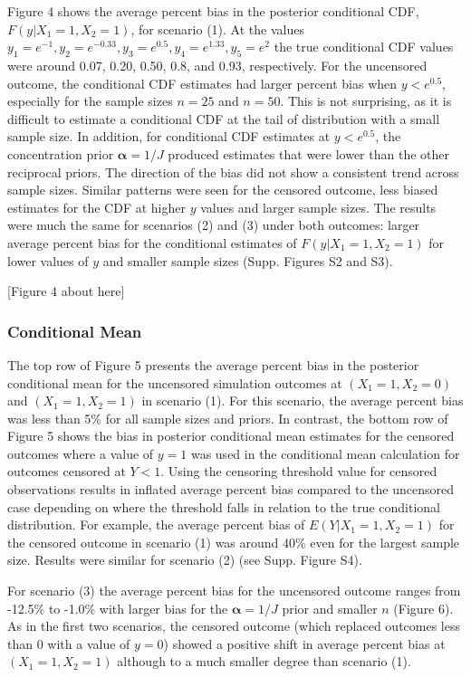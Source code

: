 \documentclass[
]{article}
\begin{document}
Figure 4 shows the average percent bias in the posterior conditional CDF, \(F(y|X_1=1,X_2=1)\), for scenario (1). At the values \(y_1=e^{-1},y_2=e^{-0.33},y_3=e^{0.5},y_4=e^{1.33},y_5=e^2\) the true conditional CDF values were around 0.07, 0.20, 0.50, 0.8, and 0.93, respectively. For the uncensored outcome, the conditional CDF estimates had larger percent bias when \(y<e^{0.5}\), especially for the sample sizes \(n=25\) and \(n=50\). This is not surprising, as it is difficult to estimate a conditional CDF at the tail of distribution with a small sample size. In addition, for conditional CDF estimates at \(y<e^{0.5}\), the concentration prior \(\boldsymbol{\alpha}=1/J\) produced estimates that were lower than the other reciprocal priors. The direction of the bias did not show a consistent trend across sample sizes. Similar patterns were seen for the censored outcome, less biased estimates for the CDF at higher \(y\) values and larger sample sizes. The results were much the same for scenarios (2) and (3) under both outcomes: larger average percent bias for the conditional estimates of \(F(y|X_1=1,X_2=1)\) for lower values of \(y\) and smaller sample sizes (Supp. Figures S2 and S3).

{[}Figure 4 about here{]}

\hypertarget{conditional-mean}{%
\subsubsection{Conditional Mean}\label{conditional-mean}}

The top row of Figure 5 presents the average percent bias in the posterior conditional mean for the uncensored simulation outcomes at \((X_1=1,X_2=0)\) and \((X_1=1,X_2=1)\) in scenario (1). For this scenario, the average percent bias was less than 5\% for all sample sizes and priors. In contrast, the bottom row of Figure 5 shows the bias in posterior conditional mean estimates for the censored outcomes where a value of \(y=1\) was used in the conditional mean calculation for outcomes censored at \(Y<1\). Using the censoring threshold value for censored observations results in inflated average percent bias compared to the uncensored case depending on where the threshold falls in relation to the true conditional distribution. For example, the average percent bias of \(E(Y|X_1=1,X_2=1)\) for the censored outcome in scenario (1) was around 40\% even for the largest sample size. Results were similar for scenario (2) (see Supp. Figure S4).

For scenario (3) the average percent bias for the uncensored outcome ranges from -12.5\% to -1.0\% with larger bias for the \(\boldsymbol{\alpha}=1/J\) prior and smaller \(n\) (Figure 6). As in the first two scenarios, the censored outcome (which replaced outcomes less than 0 with a value of \(y=0\)) showed a positive shift in average percent bias at \((X_1=1,X_2=1)\) although to a much smaller degree than scenario (1).
\end{document}
